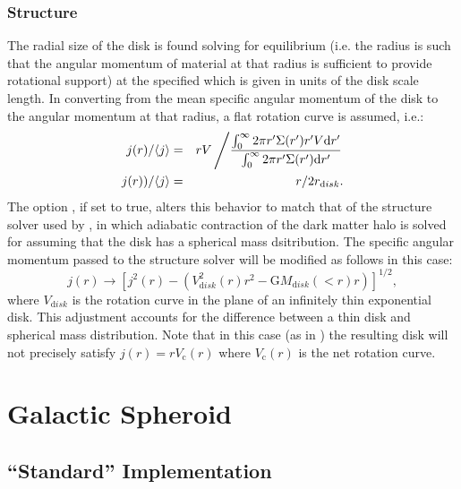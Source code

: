 \subsubsection{Structure}

The radial size of the disk is found solving for equilibrium (i.e. the radius is such that the angular momentum of material at that radius is sufficient to provide rotational support) at the specified {\normalfont \ttfamily [diskStructureSolverRadius]} which is given in units of the disk scale length. In converting from the mean specific angular momentum of the disk to the angular momentum at that radius, a flat rotation curve is assumed, i.e.:
\begin{eqnarray}
 j(r)/\langle j \rangle &=& r V \left/ {\int_0^\infty 2 \pi r^\prime \Sigma(r^\prime) r^\prime V {\mathrm d} r^\prime \over \int_0^\infty 2 \pi r^\prime \Sigma(r^\prime) {\mathrm d} r^\prime} \right. \nonumber \\
 j(r))/\langle j \rangle &=& r / 2 r_{\mathrm disk}.
\end{eqnarray}
The option {\normalfont {}}, if set to {\normalfont \ttfamily true}, alters this behavior to match that of the structure solver used by \cite{cole_hierarchical_2000}, in which adiabatic contraction of the dark matter halo is solved for assuming that the disk has a spherical mass dsitribution. The specific angular momentum passed to the structure solver will be modified as follows in this case:
\begin{equation}
 j(r) \rightarrow \left[ j^2(r) - \left( V_{\mathrm disk}^2(r) r^2 - {\mathrm G} M_{\mathrm disk}(<r) r \right) \right]^{1/2},
\end{equation}
where $V_{\mathrm disk}$ is the rotation curve in the plane of an infinitely thin exponential disk. This adjustment accounts for the difference between a thin disk and spherical mass distribution. Note that in this case (as in \citealt{cole_hierarchical_2000}) the resulting disk will not precisely satisfy $j(r) = r V_{\mathrm c}(r)$ where $V_{\mathrm c}(r)$ is the net rotation curve.

\section{Galactic Spheroid}\label{sec:ComponentSpheroid}

\subsection{``Standard'' Implementation}


